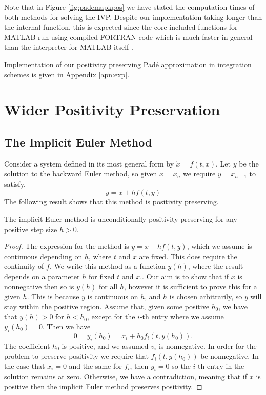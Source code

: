 Note that in Figure \ref{fig:pademapkpos} we have stated the computation times of both methods for solving the IVP.
Despite our implementation taking longer than the internal function,
this is expected since the core included functions for MATLAB run using compiled FORTRAN code which is much faster in general than the interpreter for MATLAB itself \cite{moler2020history}.

Implementation of our positivity preserving Pad\'e approximation in integration schemes is given in Appendix \ref{apn:exp}.

\section{Wider Positivity Preservation}

\subsection{The Implicit Euler Method}
Consider a system defined in its most general form by $\dot{x} = f(t,x)$.
Let $y$ be the solution to the backward Euler method, so given $x = x_n$ we require $y = x_{n+1}$ to satisfy.
\begin{equation*}
    y = x + h f(t,y)
\end{equation*}
The following result shows that this method is positivity preserving.
\begin{theorem}
    The implicit Euler method is unconditionally positivity preserving for any positive step size $h > 0$.
\end{theorem}
\begin{proof}
    The expression for the method is $y = x + hf(t,y)$, which we assume is continuous depending on $h$, where $t$ and $x$ are fixed.
    This does require the continuity of $f$.
    We write this method as a function $y(h)$, where the result depends on a parameter $h$ for fixed $t$ and $x$..
    Our aim is to show that if $x$ is nonnegative then so is $y(h)$ for all $h$, however it is sufficient to prove this for a given $h$.
    This is because $y$ is continuous on $h$, and $h$ is chosen arbitrarily, so $y$ will stay within the positive region.
    Assume that, given some positive $h_0$, we have that $y(h) > 0$ for $h < h_0$, except for the $i$-th entry where we assume $y_i(h_0) = 0$.
    Then we have
    \begin{equation*}
        0 = y_i(h_0) = x_i + h_0 f_i(t, y(h_0)).
    \end{equation*}
    The coefficient $h_0$ is positive, and we assumed $v_i$ is nonnegative. In order for the problem to preserve positivity we require that $f_i(t, y(h_0))$ be nonnegative.
    In the case that $x_i = 0$ and the same for $f_i$, then $y_i = 0$ so the $i$-th entry in the solution remains at zero.
    Otherwise, we have a contradiction, meaning that if $x$ is positive then the implicit Euler method preserves positivity.
\end{proof}
